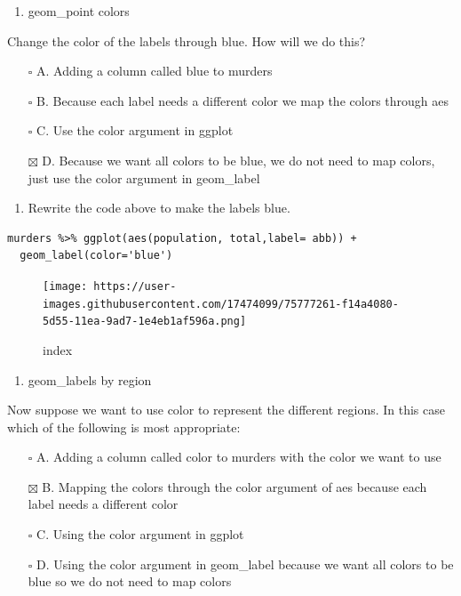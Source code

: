 \documentclass[
]{article}
\providecommand{\tightlist}{%
  \setlength{\itemsep}{0pt}\setlength{\parskip}{0pt}}
\begin{document}
\begin{enumerate}
\def\labelenumi{\arabic{enumi}.}
\setcounter{enumi}{8}
\tightlist
\item
  geom\_point colors
\end{enumerate}

Change the color of the labels through blue. How will we do this?

\begin{itemize}
\tightlist
\item[$\square$]
  A. Adding a column called blue to murders
\item[$\square$]
  B. Because each label needs a different color we map the colors
  through aes
\item[$\square$]
  C. Use the color argument in ggplot
\item[$\boxtimes$]
  D. Because we want all colors to be blue, we do not need to map
  colors, just use the color argument in geom\_label
\end{itemize}

\begin{enumerate}
\def\labelenumi{\arabic{enumi}.}
\setcounter{enumi}{9}
\tightlist
\item
  Rewrite the code above to make the labels blue.
\end{enumerate}

\begin{verbatim}
murders %>% ggplot(aes(population, total,label= abb)) +
  geom_label(color='blue')
\end{verbatim}

\begin{figure}
\centering
\texttt{[image: https://user-images.githubusercontent.com/17474099/75777261-f14a4080-5d55-11ea-9ad7-1e4eb1af596a.png]}
\caption{index}
\end{figure}

\begin{enumerate}
\def\labelenumi{\arabic{enumi}.}
\setcounter{enumi}{10}
\tightlist
\item
  geom\_labels by region
\end{enumerate}

Now suppose we want to use color to represent the different regions. In
this case which of the following is most appropriate:

\begin{itemize}
\tightlist
\item[$\square$]
  A. Adding a column called color to murders with the color we want to
  use
\item[$\boxtimes$]
  B. Mapping the colors through the color argument of aes because each
  label needs a different color
\item[$\square$]
  C. Using the color argument in ggplot
\item[$\square$]
  D. Using the color argument in geom\_label because we want all colors
  to be blue so we do not need to map colors
\end{itemize}
\end{document}

